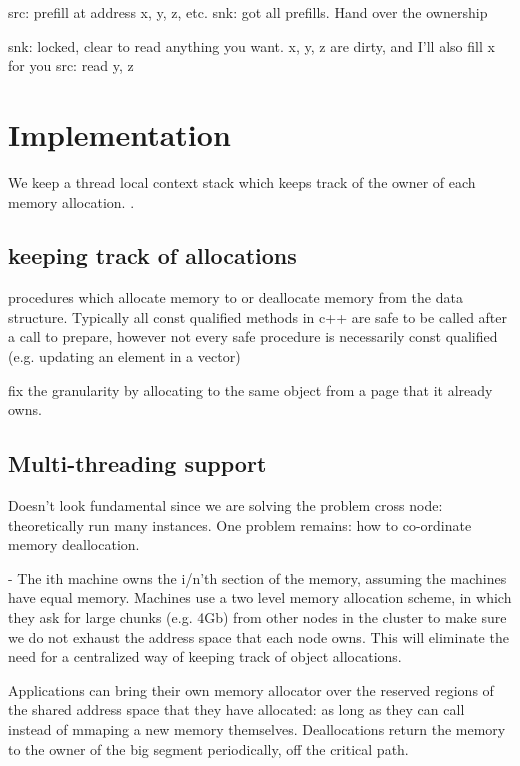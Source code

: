src: prefill at address x, y, z, etc.
snk: got all prefills. Hand over the ownership

snk: locked, clear to read anything you want. x, y, z are dirty, and I'll also fill x for you
src: read y, z

\section{Implementation}
We keep a thread local context stack which keeps track of the owner of each memory allocation. .

\subsection{keeping track of allocations}
\label{subsec:trackallocations}

  procedures which allocate memory to or deallocate memory from the data structure. Typically all const qualified methods in c++ 
  are safe to be called after a call to prepare, however not every safe procedure is necessarily const qualified (e.g. updating an element in a vector)

fix the granularity by allocating to the same object from a page that it already owns.

\subsection{Multi-threading support}
Doesn't look fundamental since we are solving the problem cross node: theoretically run many instances.
One problem remains: how to co-ordinate memory deallocation. 

- The ith machine owns the i/n'th section of the memory, assuming the machines have equal memory.
Machines use a two level memory
allocation scheme, in which they ask for large chunks (e.g. 4Gb) from other nodes in the cluster to make sure we do not exhaust
the address space that each node owns. This will eliminate the need for a centralized way of keeping track of object allocations.


Applications can bring their own memory allocator over the reserved regions of the shared address space that they have allocated: as long as they can call instead of mmaping a new memory themselves.
Deallocations return the memory to the owner of the big segment periodically, off the critical path. 


